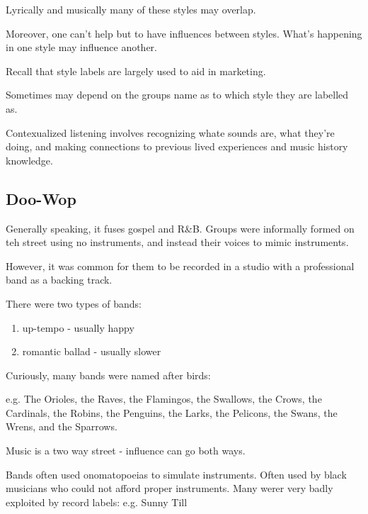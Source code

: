 \documentclass[12pt, a4paper, twoside, openright, titlepage]{book}
\begin{document}
\begin{rmk}{}{}
    Lyrically and musically many of these styles may overlap.
\end{rmk}

Moreover, one can't help but to have influences between styles. What's happening in one style may influence another.

\begin{rec}{}{}
    Recall that style labels are largely used to aid in marketing.

    Sometimes may depend on the groups name as to which style they are labelled as.
\end{rec}

\begin{rmk}{}{}
    Contexualized listening involves recognizing whate sounds are, what they're doing, and making connections to previous lived experiences and music history knowledge.
\end{rmk}


\subsection{Doo-Wop}

Generally speaking, it fuses gospel and R\&B. Groups were informally formed on teh street using no instruments, and instead their voices to mimic instruments.

However, it was common for them to be recorded in a studio with a professional band as a backing track.

There were two types of bands: \begin{enumerate}
    \item up-tempo - usually happy
    \item romantic ballad - usually slower
\end{enumerate}

\begin{rmk}{}{}
    Curiously, many bands were named after birds:


    e.g. The Orioles, the Raves, the Flamingos, the Swallows, the Crows, the Cardinals, the Robins, the Penguins, the Larks, the Pelicons, the Swans, the Wrens, and the Sparrows.
\end{rmk}

\begin{note}{}{}
    Music is a two way street - influence can go both ways.
\end{note}

Bands often used onomatopoeias to simulate instruments. Often used by black musicians who could not afford proper instruments. Many werer very badly exploited by record labels: e.g. Sunny Till
\end{document}
